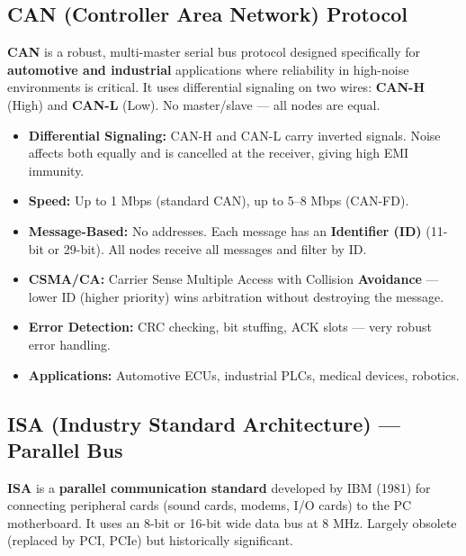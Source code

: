 \documentclass[12pt,a4paper]{article}
\begin{document}
\subsection{CAN (Controller Area Network) Protocol}

\begin{tcolorbox}[defbox, title={\textbf{CAN Bus Protocol}}]
\textbf{CAN} is a robust, multi-master serial bus protocol designed specifically for \textbf{automotive and industrial} applications where reliability in high-noise environments is critical. It uses differential signaling on two wires: \textbf{CAN-H} (High) and \textbf{CAN-L} (Low). No master/slave --- all nodes are equal.
\end{tcolorbox}

\begin{itemize}[leftmargin=*, itemsep=3pt]
  \item \textbf{Differential Signaling:} CAN-H and CAN-L carry inverted signals. Noise affects both equally and is cancelled at the receiver, giving high EMI immunity.
  \item \textbf{Speed:} Up to 1 Mbps (standard CAN), up to 5--8 Mbps (CAN-FD).
  \item \textbf{Message-Based:} No addresses. Each message has an \textbf{Identifier (ID)} (11-bit or 29-bit). All nodes receive all messages and filter by ID.
  \item \textbf{CSMA/CA:} Carrier Sense Multiple Access with Collision \textbf{Avoidance} --- lower ID (higher priority) wins arbitration without destroying the message.
  \item \textbf{Error Detection:} CRC checking, bit stuffing, ACK slots --- very robust error handling.
  \item \textbf{Applications:} Automotive ECUs, industrial PLCs, medical devices, robotics.
\end{itemize}

\subsection{ISA (Industry Standard Architecture) --- Parallel Bus}

\begin{tcolorbox}[defbox, title={\textbf{ISA Bus}}]
\textbf{ISA} is a \textbf{parallel communication standard} developed by IBM (1981) for connecting peripheral cards (sound cards, modems, I/O cards) to the PC motherboard. It uses an 8-bit or 16-bit wide data bus at 8 MHz. Largely obsolete (replaced by PCI, PCIe) but historically significant.
\end{tcolorbox}
\end{document}
